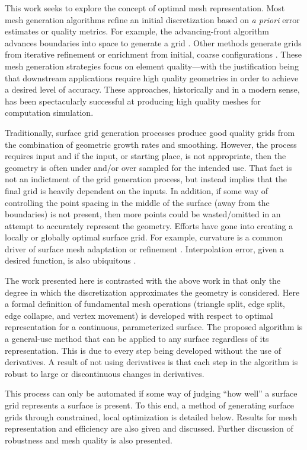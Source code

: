 This work seeks to explore the concept of optimal mesh representation.
Most mesh generation algorithms refine an initial discretization based
on {\it a priori} error estimates or quality metrics. For example, the
advancing-front algorithm advances boundaries into space to generate a
grid \cite{tristrano98,diaz-morcillo98}. Other methods generate
grids from iterative refinement or enrichment from initial, coarse
configurations \cite{marcum98,marcum00,shewchuk02}. These mesh
generation strategies focus on element quality---with the
justification being that downstream applications require high quality
geometries in order to achieve a desired level of accuracy. These
approaches, historically and in a modern sense, has been spectacularly
successful at producing high quality meshes for computation simulation.

Traditionally, surface grid generation processes produce good quality
grids from the combination of geometric growth rates and smoothing.
However, the process requires input and if the input, or starting place,
is not appropriate, then the geometry is often under and/or over sampled
for the intended use. That fact is not an indictment of the grid
generation process, but instead implies that the final grid is heavily
dependent on the inputs. In addition, if some way of controlling the
point spacing in the middle of the surface (away from the boundaries) is
not present, then more points could be wasted/omitted in an attempt to
accurately represent the geometry. Efforts have gone into
creating a locally or globally optimal surface grid. For example,
curvature is a common driver of surface mesh adaptation or refinement
\cite{siqueria13}. Interpolation error, given a desired function, 
is also ubiquitous \cite{peraire87,alauzet06,buscaglia97,huang05}.

The work presented here is contrasted with the above work in that only
the degree in which the discretization approximates the geometry is
considered.  Here a formal definition of fundamental mesh operations
(triangle split, edge split, edge collapse, and vertex movement) is
developed with respect to optimal representation for a continuous,
parameterized surface. The proposed algorithm is a general-use method
that can be applied to any surface regardless of its representation.
This is due to every step being developed without the use of
derivatives. A result of not using derivatives is that each step in the
algorithm is robust to large or discontinuous changes in derivatives.

This process can only be automated if some way of judging ``how well'' a
surface grid represents a surface is present. To this end, a method of
generating surface grids through constrained, local optimization is
detailed below. Results for mesh representation and efficiency are also
given and discussed.  Further discussion of robustness and mesh quality
is also presented.

